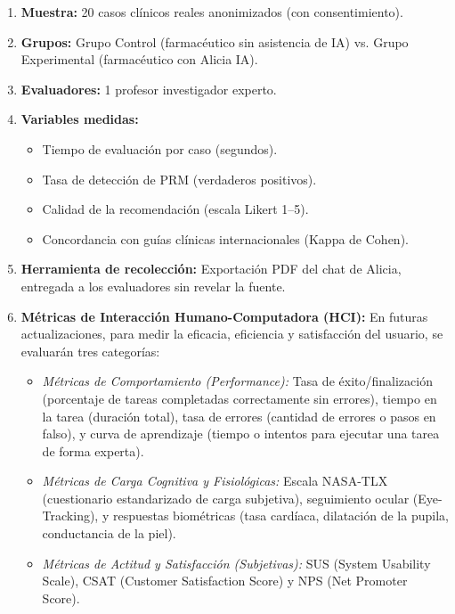 \documentclass[12pt,a4paper]{article}
\begin{document}
\begin{enumerate}
  \item \textbf{Muestra:} 20 casos clínicos reales anonimizados (con consentimiento).
  \item \textbf{Grupos:} Grupo Control (farmacéutico sin asistencia de IA) vs. Grupo Experimental
    (farmacéutico con Alicia IA).
  \item \textbf{Evaluadores:} 1 profesor investigador experto.
  \item \textbf{Variables medidas:}
    \begin{itemize}
      \item Tiempo de evaluación por caso (segundos).
      \item Tasa de detección de PRM (verdaderos positivos).
      \item Calidad de la recomendación (escala Likert 1--5).
      \item Concordancia con guías clínicas internacionales (Kappa de Cohen).
    \end{itemize}
  \item \textbf{Herramienta de recolección:} Exportación PDF del chat de Alicia, entregada a los
    evaluadores sin revelar la fuente.
  \item \textbf{Métricas de Interacción Humano-Computadora (HCI):} En futuras actualizaciones, para medir la eficacia, eficiencia y satisfacción del usuario, se evaluarán tres categorías:
    \begin{itemize}
      \item \textit{Métricas de Comportamiento (Performance):} Tasa de éxito/finalización (porcentaje de tareas completadas correctamente sin errores), tiempo en la tarea (duración total), tasa de errores (cantidad de errores o pasos en falso), y curva de aprendizaje (tiempo o intentos para ejecutar una tarea de forma experta).
      \item \textit{Métricas de Carga Cognitiva y Fisiológicas:} Escala NASA-TLX (cuestionario estandarizado de carga subjetiva), seguimiento ocular (Eye-Tracking), y respuestas biométricas (tasa cardíaca, dilatación de la pupila, conductancia de la piel).
      \item \textit{Métricas de Actitud y Satisfacción (Subjetivas):} SUS (System Usability Scale), CSAT (Customer Satisfaction Score) y NPS (Net Promoter Score).
    \end{itemize}
\end{enumerate}

\newpage
\end{document}
